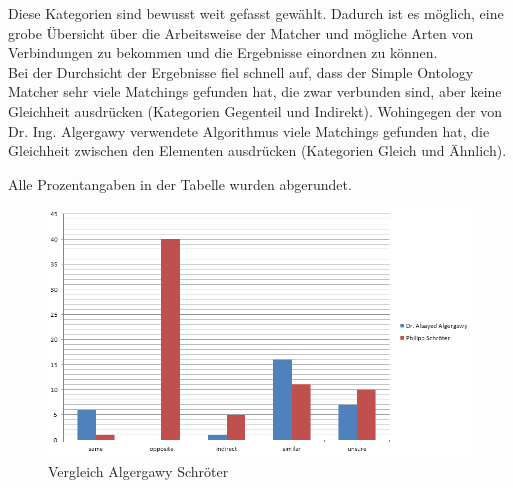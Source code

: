 		Diese Kategorien sind bewusst weit gefasst gewählt. Dadurch ist es
		möglich, eine grobe Übersicht über die Arbeitsweise der Matcher und mögliche
		Arten von Verbindungen zu bekommen und die Ergebnisse einordnen zu können.\\
		Bei der Durchsicht der Ergebnisse fiel schnell auf, dass der Simple Ontology
		Matcher sehr viele Matchings gefunden hat, die zwar verbunden sind, aber keine
		Gleichheit ausdrücken (Kategorien Gegenteil und Indirekt).
		Wohingegen der von Dr. Ing. Algergawy verwendete Algorithmus viele Matchings
		gefunden hat, die Gleichheit zwischen den Elementen ausdrücken (Kategorien
		Gleich und Ähnlich).\\
		
		\begin{center}
		\begin{table}[h!]
		\small
		\setlength\tabcolsep{2pt}
		\caption{Kategorisierte Ergebnisse}
		\noindent{}
		\end{table}
		\end{center}
		Alle Prozentangaben in der Tabelle wurden abgerundet.\\
				
		\begin{figure}[h!]
		\centering
		\includegraphics[width=1.0\textwidth]{pics/Vergleich-Algergawy-Schroeter_2016-11-22.png}
		\caption{Vergleich Algergawy Schröter}
		\label{fig16}
		\end{figure}
		
